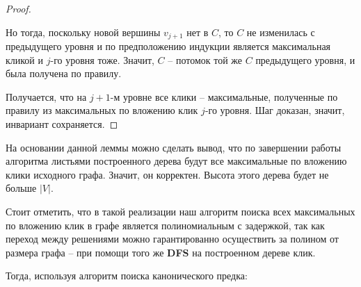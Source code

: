 \documentclass[a4paper,12pt]{article}
\begin{document}
\begin{proof}
\begin{itemize}
        Но тогда, поскольку новой вершины $v_{j + 1}$ нет в $C$, то $C$ не изменилась с предыдущего уровня и  по предположению индукции является максимальная кликой и $j$-го уровня тоже. Значит, $C$ -- потомок той же $C$ предыдущего уровня, и была получена по правилу.
    \end{itemize}
    
    Получается, что на $j + 1$-м уровне все клики -- максимальные, полученные по правилу из максимальных по вложению клик $j$-го уровня. Шаг доказан, значит, инвариант сохраняется.
\end{proof}

На основании данной леммы можно сделать вывод, что по завершении работы алгоритма листьями построенного дерева будут все максимальные по вложению клики исходного графа. Значит, он корректен. Высота этого дерева будет не больше $|V|$. 

Стоит отметить, что в такой реализации наш алгоритм поиска всех максимальных по вложению клик в графе является полиномиальным с задержкой, так как переход между решениями можно гарантированно осуществить за полином от размера графа -- при помощи того же \textbf{DFS} на построенном дереве клик.

Тогда, используя алгоритм поиска канонического предка:
\end{document}
